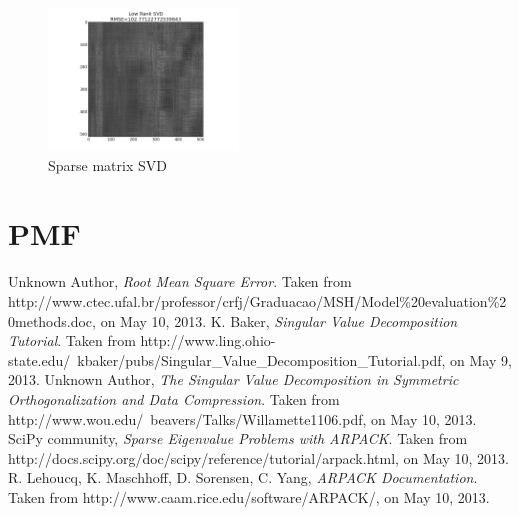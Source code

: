 \documentclass[journal]{IEEEtran}
\begin{document}
\begin{figure}[h!]
\centering
    \includegraphics[width=0.45\textwidth]{sparsesvd.png}
    \caption{Sparse matrix SVD}
    \label{fig:sparseSVD}
\end{figure}

\section{PMF}

%

\begin{thebibliography}{1}
Unknown Author, \emph{Root Mean Square Error}. Taken from http://www.ctec.ufal.br/professor/crfj/Graduacao/MSH/Model\%20evaluation\%20methods.doc,
on May 10, 2013.
K. Baker, \emph{Singular Value Decomposition Tutorial}. Taken from 
http://www.ling.ohio-state.edu/~kbaker/pubs/Singular\_Value\_Decomposition\_Tutorial.pdf, on May 9, 2013.
Unknown Author, \emph{The Singular Value Decomposition in Symmetric Orthogonalization and Data Compression}.
Taken from http://www.wou.edu/~beavers/Talks/Willamette1106.pdf, on May 10, 2013.
SciPy community, \emph{Sparse Eigenvalue Problems with ARPACK}. 
Taken from http://docs.scipy.org/doc/scipy/reference/tutorial/arpack.html, on May 10, 2013.
R. Lehoucq, K. Maschhoff, D. Sorensen, C. Yang, \emph{ARPACK Documentation}. Taken from http://www.caam.rice.edu/software/ARPACK/, on May 10, 2013.
\end{thebibliography}




\end{document}
